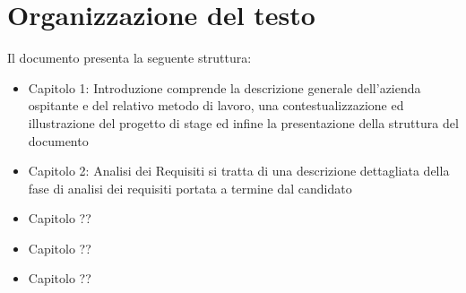 \section{Organizzazione del testo}
Il documento presenta la seguente struttura:
\begin{itemize}
    \item Capitolo 1: Introduzione comprende la descrizione generale dell'azienda ospitante e del relativo metodo di lavoro, una contestualizzazione ed illustrazione del progetto di stage ed infine la presentazione della struttura del documento
    \item Capitolo 2: Analisi dei Requisiti si tratta di una descrizione dettagliata della fase di analisi dei requisiti portata a termine dal candidato
    \item Capitolo ??
    \item Capitolo ??
    \item Capitolo ??
\end{itemize}




